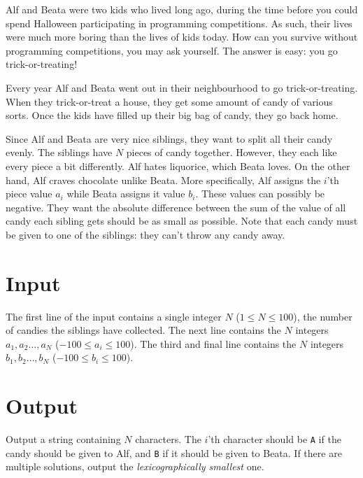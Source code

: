 
\noindent
Alf and Beata were two kids who lived long ago, during the time before you could spend Halloween participating in programming competitions.
As such, their lives were much more boring than the lives of kids today.
How can you survive without programming competitions, you may ask yourself.
The answer is easy: you go trick-or-treating!

Every year Alf and Beata went out in their neighbourhood to go trick-or-treating.
When they trick-or-treat a house, they get some amount of candy of various sorts.
Once the kids have filled up their big bag of candy, they go back home.

Since Alf and Beata are very nice siblings, they want to split all their candy evenly.
The siblings have $N$ pieces of candy together.
However, they each like every piece a bit differently.
Alf hates liquorice, which Beata loves.
On the other hand, Alf craves chocolate unlike Beata.
More specifically, Alf assigns the $i$'th piece value $a_i$ while Beata assigns it value $b_i$.
These values can possibly be negative.
They want the absolute difference between the sum of the value of all candy each sibling gets should be as small as possible.
Note that each candy must be given to one of the siblings: they can't throw any candy away.

\section*{Input}
The first line of the input contains a single integer $N$ ($1 \le N \le 100$), the number of candies the siblings have collected.
The next line contains the $N$ integers $a_1, a_2 \dots, a_N$ ($-100 \le a_i \le 100$).
The third and final line contains the $N$ integers $b_1, b_2 \dots, b_N$ ($-100 \le b_i \le 100$).

\section*{Output}
Output a string containing $N$ characters.
The $i$'th character should be \texttt{A} if the candy should be given to Alf, and \texttt{B} if it should be given to Beata.
If there are multiple solutions, output the \emph{lexicographically smallest} one.
